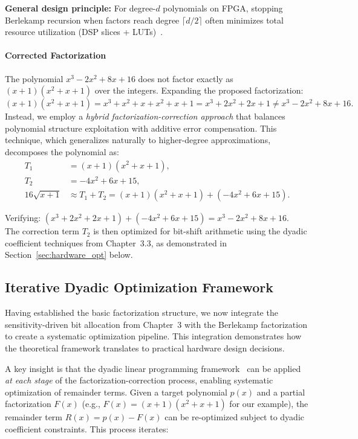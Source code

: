 \noindent\textbf{General design principle:} For degree-$d$ polynomials on FPGA, stopping Berlekamp recursion when factors reach degree $\lceil d/2 \rceil$ often minimizes total resource utilization (DSP slices + LUTs)~\cite{SinhaSrikanthan2014,gathen2013modern}.

\paragraph{Corrected Factorization}

The polynomial $x^3 - 2x^2 + 8x + 16$ does not factor exactly as $(x+1)(x^2+x+1)$ over the integers. Expanding the proposed factorization:
\[
(x+1)(x^2+x+1) = x^3 + x^2 + x + x^2 + x + 1 = x^3 + 2x^2 + 2x + 1 \neq x^3 - 2x^2 + 8x + 16.
\]
Instead, we employ a \emph{hybrid factorization-correction approach} that balances polynomial structure exploitation with additive error compensation. This technique, which generalizes naturally to higher-degree approximations, decomposes the polynomial as:
\begin{align}
T_1 &= (x+1)(x^2+x+1), \label{eq:arccos_t1}\\
T_2 &= -4 x^2 + 6x + 15, \label{eq:arccos_t2}\\
16\sqrt{x+1} &\approx T_1 + T_2 = (x+1)(x^2+x+1) + (-4x^2 + 6x + 15). \label{eq:arccos_full}
\end{align}

Verifying: $(x^3 + 2x^2 + 2x + 1) + (-4x^2 + 6x + 15) = x^3 - 2x^2 + 8x + 16$. \\

\noindent The correction term $T_2$ is then optimized for bit-shift arithmetic using the dyadic coefficient techniques from Chapter~3.3, as demonstrated in Section~\ref{sec:hardware_opt} below.

\subsection{Iterative Dyadic Optimization Framework}

Having established the basic factorization structure, we now integrate the sensitivity-driven bit allocation from Chapter~3 with the Berlekamp factorization to create a systematic optimization pipeline. This integration demonstrates how the theoretical framework translates to practical hardware design decisions.

A key insight is that the dyadic linear programming framework~\cite{Abdi2024} can be applied \emph{at each stage} of the factorization-correction process, enabling systematic optimization of remainder terms. Given a target polynomial $p(x)$ and a partial factorization $F(x)$ (e.g., $F(x) = (x+1)(x^2+x+1)$ for our example), the remainder term $R(x) = p(x) - F(x)$ can be re-optimized subject to dyadic coefficient constraints. This process iterates:

